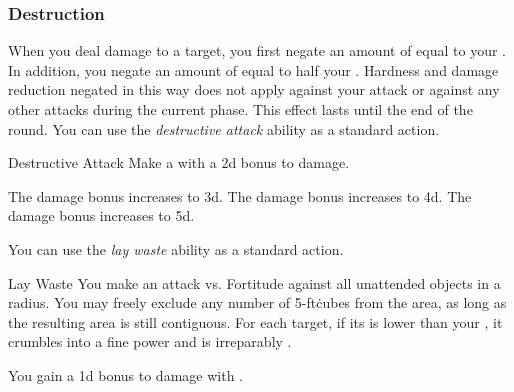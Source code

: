         \subsubsection{Destruction}
             When you deal damage to a target, you first negate an amount of  equal to your .
            In addition, you negate an amount of  equal to half your .
            Hardness and damage reduction negated in this way does not apply against your attack or against any other attacks during the current phase.
            This effect lasts until the end of the round.
             You can use the \textit{destructive attack} ability as a standard action.
            \begin{apability}{Destructive Attack}
                Make a  with a \plus2d bonus to damage.

                \rankline
                 The damage bonus increases to \plus3d.
                 The damage bonus increases to \plus4d.
                 The damage bonus increases to \plus5d.
            \end{apability}
             You can use the \textit{lay waste} ability as a standard action.
            \begin{apability}{Lay Waste}
                You make an attack vs. Fortitude against all unattended objects in a \arealarge radius.
                You may freely exclude any number of 5-ft\. cubes from the area, as long as the resulting area is still contiguous.
                \hit For each target, if its  is lower than your , it crumbles into a fine power and is irreparably .
            \end{apability}
             You gain a \plus1d bonus to damage with .

